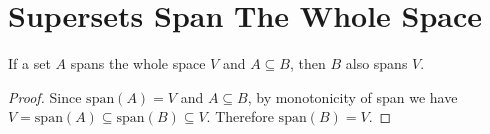 \section{Supersets Span The Whole Space}

\begin{theorem}
  \label{theorem : superset_span_full}
  \leanok
  If a set $A$ spans the whole space $V$ and $A \subseteq B$, then $B$ also spans $V$.
\end{theorem}

\begin{proof}
  Since $\text{span}(A) = V$ and $A \subseteq B$, by monotonicity of span we have $V = \text{span}(A) \subseteq \text{span}(B) \subseteq V$. Therefore $\text{span}(B) = V$.
\end{proof}